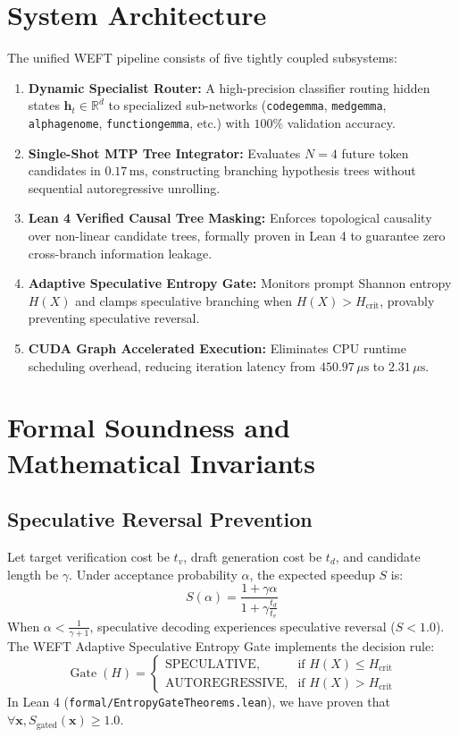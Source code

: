 \documentclass[11pt,a4paper]{article}
\begin{document}
\section{System Architecture}
The unified WEFT pipeline consists of five tightly coupled subsystems:
\begin{enumerate}
    \item \textbf{Dynamic Specialist Router:} A high-precision classifier routing hidden states $\mathbf{h}_t \in \mathbb{R}^{d}$ to specialized sub-networks (\texttt{codegemma}, \texttt{medgemma}, \texttt{alphagenome}, \texttt{functiongemma}, etc.) with $100\%$ validation accuracy.
    \item \textbf{Single-Shot MTP Tree Integrator:} Evaluates $N=4$ future token candidates in $0.17\,\text{ms}$, constructing branching hypothesis trees without sequential autoregressive unrolling.
    \item \textbf{Lean 4 Verified Causal Tree Masking:} Enforces topological causality over non-linear candidate trees, formally proven in Lean 4 to guarantee zero cross-branch information leakage.
    \item \textbf{Adaptive Speculative Entropy Gate:} Monitors prompt Shannon entropy $H(X)$ and clamps speculative branching when $H(X) > H_{\text{crit}}$, provably preventing speculative reversal.
    \item \textbf{CUDA Graph Accelerated Execution:} Eliminates CPU runtime scheduling overhead, reducing iteration latency from $450.97\,\mu\text{s}$ to $2.31\,\mu\text{s}$.
\end{enumerate}

\section{Formal Soundness and Mathematical Invariants}
\subsection{Speculative Reversal Prevention}
Let target verification cost be $t_v$, draft generation cost be $t_d$, and candidate length be $\gamma$. Under acceptance probability $\alpha$, the expected speedup $S$ is:
\begin{equation}
S(\alpha) = \frac{1 + \gamma \alpha}{1 + \gamma \frac{t_d}{t_v}}
\end{equation}
When $\alpha < \frac{1}{\gamma + 1}$, speculative decoding experiences speculative reversal ($S < 1.0$). The WEFT Adaptive Speculative Entropy Gate implements the decision rule:
\begin{equation}
\operatorname{Gate}(H) = \begin{cases}
\text{SPECULATIVE}, & \text{if } H(X) \le H_{\text{crit}} \\
\text{AUTOREGRESSIVE}, & \text{if } H(X) > H_{\text{crit}}
\end{cases}
\end{equation}
In Lean 4 (\texttt{formal/EntropyGateTheorems.lean}), we have proven that $\forall \mathbf{x}, S_{\text{gated}}(\mathbf{x}) \ge 1.0$.
\end{document}
